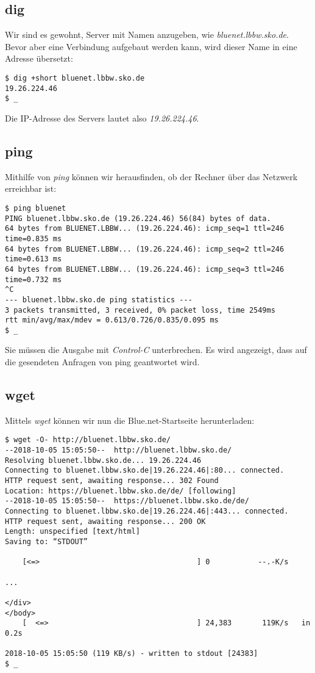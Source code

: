 \documentclass[titlepage,a4paper]{article}
\begin{document}
\subsection{dig}

Wir sind es gewohnt, Server mit Namen anzugeben, wie \emph{bluenet.lbbw.sko.de}.
Bevor aber eine Verbindung aufgebaut werden kann, wird dieser Name in eine Adresse
übersetzt:

\begin{verbatim}
$ dig +short bluenet.lbbw.sko.de
19.26.224.46
$ _
\end{verbatim}

\noindent
Die IP-Adresse des Servers lautet also \emph{19.26.224.46}.

\subsection{ping}

Mithilfe von \emph{ping} können wir herausfinden, ob der Rechner über das Netzwerk erreichbar ist:

\begin{verbatim}
$ ping bluenet
PING bluenet.lbbw.sko.de (19.26.224.46) 56(84) bytes of data.
64 bytes from BLUENET.LBBW... (19.26.224.46): icmp_seq=1 ttl=246 time=0.835 ms
64 bytes from BLUENET.LBBW... (19.26.224.46): icmp_seq=2 ttl=246 time=0.613 ms
64 bytes from BLUENET.LBBW... (19.26.224.46): icmp_seq=3 ttl=246 time=0.732 ms
^C
--- bluenet.lbbw.sko.de ping statistics ---
3 packets transmitted, 3 received, 0% packet loss, time 2549ms
rtt min/avg/max/mdev = 0.613/0.726/0.835/0.095 ms
$ _
\end{verbatim}

\noindent
Sie müssen die Ausgabe mit \emph{Control-C} unterbrechen.
Es wird angezeigt, dass auf die gesendeten Anfragen von ping geantwortet wird.

\subsection{wget}

Mittels \emph{wget} können wir nun die Blue.net-Startseite herunterladen:

\begin{verbatim}
$ wget -O- http://bluenet.lbbw.sko.de/
--2018-10-05 15:05:50--  http://bluenet.lbbw.sko.de/
Resolving bluenet.lbbw.sko.de... 19.26.224.46
Connecting to bluenet.lbbw.sko.de|19.26.224.46|:80... connected.
HTTP request sent, awaiting response... 302 Found
Location: https://bluenet.lbbw.sko.de/de/ [following]
--2018-10-05 15:05:50--  https://bluenet.lbbw.sko.de/de/
Connecting to bluenet.lbbw.sko.de|19.26.224.46|:443... connected.
HTTP request sent, awaiting response... 200 OK
Length: unspecified [text/html]
Saving to: “STDOUT”

    [<=>                                    ] 0           --.-K/s

...

</div>
</body>
    [  <=>                                  ] 24,383       119K/s   in 0.2s    

2018-10-05 15:05:50 (119 KB/s) - written to stdout [24383]
$ _
\end{verbatim}
\end{document}
